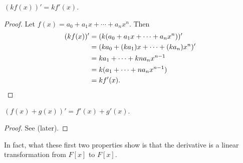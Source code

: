 \begin{proposition}
    $(kf(x))' = kf'(x)$.
\end{proposition}
\begin{proof}
    Let $f(x) = a_0 + a_1x + \cdots + a_nx^n$. Then
    \begin{align*}
        (kf(x))' &= (k(a_0 + a_1x + \cdots + a_nx^n))'\\
        &= (ka_0 + (ka_1)x + \cdots + (ka_n)x^n)'\\
        &= ka_1 + \cdots + kna_nx^{n-1}\\
        &= k(a_1 + \cdots + na_nx^{n-1})\\
        &= kf'(x).\qedhere
    \end{align*}
\end{proof}

\begin{proposition}
    $(f(x) + g(x))' = f'(x) + g'(x)$.
\end{proposition}
\begin{proof}
    See  (later).
\end{proof}

\begin{remark}
    In fact, what these first two properties show is that the derivative is a linear transformation from $F[x]$ to $F[x]$.
\end{remark}

